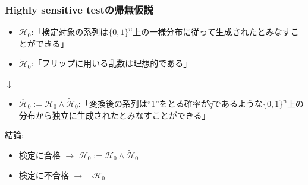 \documentclass[dvipdfmx,11pt]{beamer}
\begin{document}
\begin{frame}[c]\frametitle{Highly sensitive testの帰無仮説}
\vspace{0.5\baselineskip}
\begin{itemize}\setlength{\itemsep}{0.25\baselineskip}  
  \item $\mathcal{H}_0$:「検定対象の系列は$\{0,1\}^n$上の一様分布に従って生成されたとみなすことができる」
  \item $\widetilde{\mathcal{H}}_0$:「フリップに用いる乱数は理想的である」
\end{itemize}
%
\begin{center}
  $\downarrow$
\end{center}
%
\begin{itemize}
  \item $\overline{\mathcal{H}}_0:=\mathcal{H}_0 \land \widetilde{\mathcal{H}}_0$:「変換後の系列は``$1$''をとる確率が$\hat{q}$であるような$\{0,1\}^n$上の分布から独立に生成されたとみなすことができる」
\end{itemize}
%
\vspace{\baselineskip}
%
結論:
\vspace{0.5\baselineskip}
\begin{itemize}\setlength{\itemsep}{0.5\baselineskip}
  \item 検定に合格 $\to$ $\overline{\mathcal{H}}_0:=\mathcal{H}_0 \land \widetilde{\mathcal{H}}_0$
  \item 検定に不合格 $\to$ $\lnot\mathcal{H}_0$
\end{itemize}
\end{frame}
\end{document}
